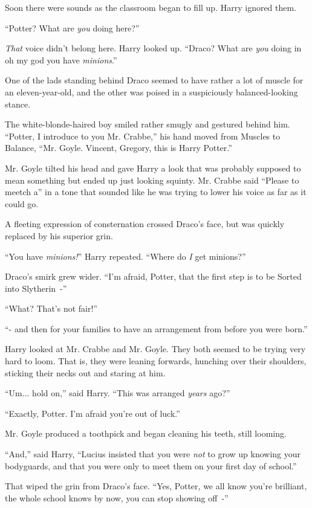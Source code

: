 Soon there were sounds as the classroom began to fill up. Harry ignored them.

``Potter? What are \emph{you} doing here?''

\emph{That} voice didn't belong here. Harry looked up. ``Draco? What are \emph{you} doing in oh my god you have \emph{minions}.''

One of the lads standing behind Draco seemed to have rather a lot of muscle for an eleven-year-old, and the other was poised in a suspiciously balanced-looking stance.

The white-blonde-haired boy smiled rather smugly and gestured behind him. ``Potter, I introduce to you Mr. Crabbe,'' his hand moved from Muscles to Balance, ``Mr. Goyle. Vincent, Gregory, this is Harry Potter.''

Mr. Goyle tilted his head and gave Harry a look that was probably supposed to mean something but ended up just looking squinty. Mr. Crabbe said ``Please to meetch a'' in a tone that sounded like he was trying to lower his voice as far as it could go.

A fleeting expression of consternation crossed Draco's face, but was quickly replaced by his superior grin.

``You have \emph{minions!}'' Harry repeated. ``Where do \emph{I} get minions?''

Draco's smirk grew wider. ``I'm afraid, Potter, that the first step is to be Sorted into Slytherin~-''

``What? That's not fair!''

``- and then for your families to have an arrangement from before you were born.''

Harry looked at Mr. Crabbe and Mr. Goyle. They both seemed to be trying very hard to loom. That is, they were leaning forwards, hunching over their shoulders, sticking their necks out and staring at him.

``Um... hold on,'' said Harry. ``This was arranged \emph{years} ago?''

``Exactly, Potter. I'm afraid you're out of luck.''

Mr. Goyle produced a toothpick and began cleaning his teeth, still looming.

``And,'' said Harry, ``Lucius insisted that you were \emph{not} to grow up knowing your bodyguards, and that you were only to meet them on your first day of school.''

That wiped the grin from Draco's face. ``Yes, Potter, we all know you're brilliant, the whole school knows by now, you can stop showing off~-''

